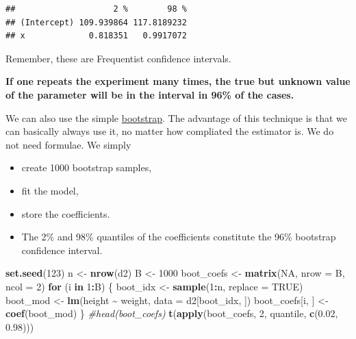 \documentclass[
]{book}
\newenvironment{Shaded}{\begin{snugshade}}{\end{snugshade}}
\newcommand{\AttributeTok}[1]{\textcolor[rgb]{0.13,0.29,0.53}{#1}}
\newcommand{\CommentTok}[1]{\textcolor[rgb]{0.56,0.35,0.01}{\textit{#1}}}
\newcommand{\ConstantTok}[1]{\textcolor[rgb]{0.56,0.35,0.01}{#1}}
\newcommand{\ControlFlowTok}[1]{\textcolor[rgb]{0.13,0.29,0.53}{\textbf{#1}}}
\newcommand{\DecValTok}[1]{\textcolor[rgb]{0.00,0.00,0.81}{#1}}
\newcommand{\FloatTok}[1]{\textcolor[rgb]{0.00,0.00,0.81}{#1}}
\newcommand{\FunctionTok}[1]{\textcolor[rgb]{0.13,0.29,0.53}{\textbf{#1}}}
\newcommand{\NormalTok}[1]{#1}
\newcommand{\OtherTok}[1]{\textcolor[rgb]{0.56,0.35,0.01}{#1}}
\newcommand{\SpecialCharTok}[1]{\textcolor[rgb]{0.81,0.36,0.00}{\textbf{#1}}}
\providecommand{\tightlist}{%
  \setlength{\itemsep}{0pt}\setlength{\parskip}{0pt}}
\begin{document}
\begin{verbatim}
##                    2 %        98 %
## (Intercept) 109.939864 117.8189232
## x             0.818351   0.9917072
\end{verbatim}

Remember, these are Frequentist confidence intervals.

\textbf{If one repeats the experiment
many times, the true but unknown value of the parameter will
be in the interval in 96\% of the cases.}

We can also use the simple \href{https://en.wikipedia.org/wiki/Bootstrapping_(statistics)}{bootstrap}.
The advantage of this technique is that we can basically always use it,
no matter how compliated the estimator is. We do not need formulae.
We simply

\begin{itemize}
\tightlist
\item
  create 1000 bootstrap samples,
\item
  fit the model,
\item
  store the coefficients.
\item
  The 2\% and 98\% quantiles of the coefficients constitute the 96\% bootstrap confidence interval.
\end{itemize}

\begin{Shaded}
\begin{Highlighting}[]
\FunctionTok{set.seed}\NormalTok{(}\DecValTok{123}\NormalTok{)}
\NormalTok{n }\OtherTok{\textless{}{-}} \FunctionTok{nrow}\NormalTok{(d2)}
\NormalTok{B }\OtherTok{\textless{}{-}} \DecValTok{1000}
\NormalTok{boot\_coefs }\OtherTok{\textless{}{-}} \FunctionTok{matrix}\NormalTok{(}\ConstantTok{NA}\NormalTok{, }\AttributeTok{nrow =}\NormalTok{ B, }\AttributeTok{ncol =} \DecValTok{2}\NormalTok{)}
\ControlFlowTok{for}\NormalTok{ (i }\ControlFlowTok{in} \DecValTok{1}\SpecialCharTok{:}\NormalTok{B) \{}
\NormalTok{  boot\_idx }\OtherTok{\textless{}{-}} \FunctionTok{sample}\NormalTok{(}\DecValTok{1}\SpecialCharTok{:}\NormalTok{n, }\AttributeTok{replace =} \ConstantTok{TRUE}\NormalTok{)}
\NormalTok{  boot\_mod }\OtherTok{\textless{}{-}} \FunctionTok{lm}\NormalTok{(height }\SpecialCharTok{\textasciitilde{}}\NormalTok{ weight, }\AttributeTok{data =}\NormalTok{ d2[boot\_idx, ])}
\NormalTok{  boot\_coefs[i, ] }\OtherTok{\textless{}{-}} \FunctionTok{coef}\NormalTok{(boot\_mod)}
\NormalTok{\}}
\CommentTok{\#head(boot\_coefs)}
\FunctionTok{t}\NormalTok{(}\FunctionTok{apply}\NormalTok{(boot\_coefs, }\DecValTok{2}\NormalTok{, quantile, }\FunctionTok{c}\NormalTok{(}\FloatTok{0.02}\NormalTok{, }\FloatTok{0.98}\NormalTok{)))}
\end{Highlighting}
\end{Shaded}
\end{document}
